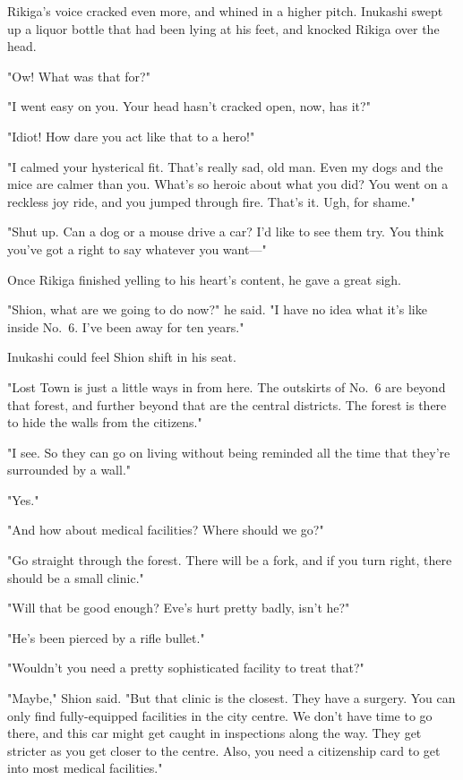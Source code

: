 Rikiga's voice cracked even more, and whined in a higher pitch. Inukashi
swept up a liquor bottle that had been lying at his feet, and knocked
Rikiga over the head.

"Ow! What was that for?"

"I went easy on you. Your head hasn't cracked open, now, has it?"

"Idiot! How dare you act like that to a hero!"

"I calmed your hysterical fit. That's really sad, old man. Even my dogs
and the mice are calmer than you. What's so heroic about what you did?
You went on a reckless joy ride, and you jumped through fire. That's it.
Ugh, for shame."

"Shut up. Can a dog or a mouse drive a car? I'd like to see them try.
You think you've got a right to say whatever you want---"

Once Rikiga finished yelling to his heart's content, he gave a great
sigh.

"Shion, what are we going to do now?" he said. "I have no idea what it's
like inside No.~6. I've been away for ten years."

Inukashi could feel Shion shift in his seat.

"Lost Town is just a little ways in from here. The outskirts of No.~6
are beyond that forest, and further beyond that are the central
districts. The forest is there to hide the walls from the citizens."

"I see. So they can go on living without being reminded all the time
that they're surrounded by a wall."

"Yes."

"And how about medical facilities? Where should we go?"

"Go straight through the forest. There will be a fork, and if you turn
right, there should be a small clinic."

"Will that be good enough? Eve's hurt pretty badly, isn't he?"

"He's been pierced by a rifle bullet."

"Wouldn't you need a pretty sophisticated facility to treat that?"

"Maybe," Shion said. "But that clinic is the closest. They have a
surgery. You can only find fully-equipped facilities in the city centre.
We don't have time to go there, and this car might get caught in
inspections along the way. They get stricter as you get closer to the
centre. Also, you need a citizenship card to get into most medical
facilities."

